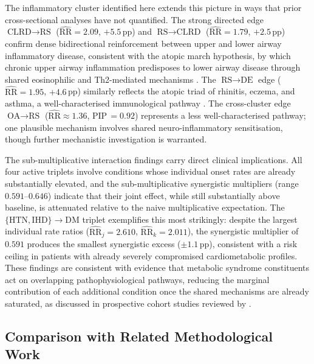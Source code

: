 \documentclass[12pt]{article}
\begin{document}
The inflammatory cluster identified here extends this picture in ways that 
prior cross-sectional analyses have not quantified. The strong directed edge 
$\text{CLRD} \to \text{RS}$ ($\widehat{\text{RR}} = 2.09$, $+5.5$\,pp) and 
$\text{RS} \to \text{CLRD}$ ($\widehat{\text{RR}} = 1.79$, $+2.5$\,pp) confirm 
dense bidirectional reinforcement between upper and lower airway inflammatory 
disease, consistent with the atopic march hypothesis, by which chronic upper 
airway inflammation predisposes to lower airway disease through shared 
eosinophilic and Th2-mediated mechanisms \citep{cheng2024chronic, 
valabhji2024prevalence}. The $\text{RS} \to \text{DE}$ edge 
($\widehat{\text{RR}} = 1.95$, $+4.6$\,pp) similarly reflects the atopic triad 
of rhinitis, eczema, and asthma, a well-characterised immunological pathway 
\citep{yang2024longitudinal}. The cross-cluster edge $\text{OA} \to \text{RS}$ 
($\widehat{\text{RR}} \approx 1.36$, PIP\,$= 0.92$) represents a less 
well-characterised pathway; one plausible mechanism involves shared 
neuro-inflammatory sensitisation, though further mechanistic investigation is 
warranted.

The sub-multiplicative interaction findings carry direct clinical implications. 
All four active triplets involve conditions whose individual onset rates are 
already substantially elevated, and the sub-multiplicative synergistic 
multipliers (range $0.591$--$0.646$) indicate that their joint effect, while 
still substantially above baseline, is attenuated relative to the naive 
multiplicative expectation. The $\{\text{HTN}, \text{IHD}\} \to \text{DM}$ 
triplet exemplifies this most strikingly: despite the largest individual rate 
ratios ($\widehat{\text{RR}}_j = 2.610$, $\widehat{\text{RR}}_k = 2.011$), 
the synergistic multiplier of $0.591$ produces the smallest synergistic excess 
($\pm1.1$\,pp), consistent with a risk ceiling in patients with already 
severely compromised cardiometabolic profiles. These findings are consistent 
with evidence that metabolic syndrome constituents act on overlapping 
pathophysiological pathways, reducing the marginal contribution of each 
additional condition once the shared mechanisms are already saturated, as 
discussed in prospective cohort studies reviewed by 
\citet{valabhji2024prevalence}.

\subsection{Comparison with Related Methodological Work}
\end{document}
